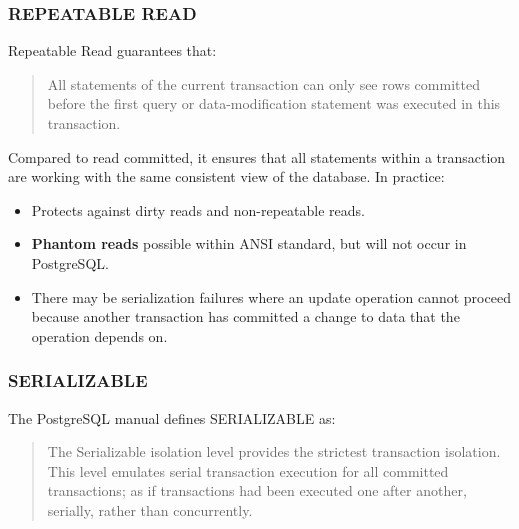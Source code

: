 \documentclass{pgnotes}
\begin{document}
\subsubsection{REPEATABLE READ}

Repeatable Read guarantees that:
\begin{quotation}
  All statements of the current transaction can only see rows committed before the first query or data-modification statement was executed in this transaction.
\end{quotation}
Compared to read committed, it ensures that all statements within a transaction are working with the same consistent view of the database.
In practice:
\begin{itemize}
\item Protects against dirty reads and non-repeatable reads.
\item \textbf{Phantom reads} possible within ANSI standard, but will not occur in PostgreSQL.
\item There may be serialization failures where an update operation cannot proceed because another transaction has committed a change to data that the operation depends on.
\end{itemize}

\subsubsection{SERIALIZABLE}

The PostgreSQL manual defines SERIALIZABLE as:
\begin{quotation}
  The Serializable isolation level provides the strictest transaction isolation. This level emulates serial transaction execution for all committed transactions; as if transactions had been executed one after another, serially, rather than concurrently.
\end{quotation}

\requiredreading
\end{document}
